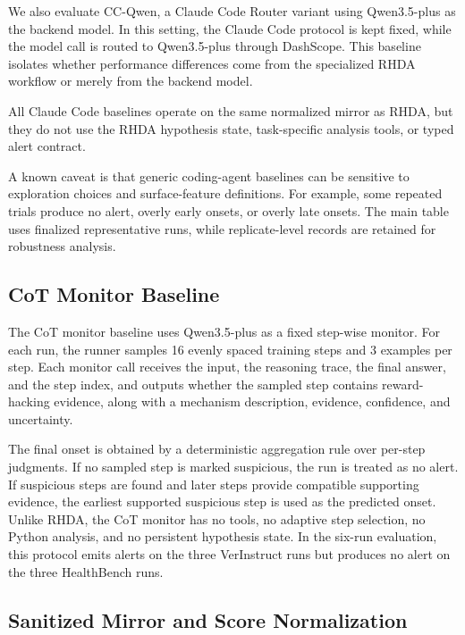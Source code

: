 \documentclass[11pt]{article}
\begin{document}
We also evaluate CC-Qwen, a Claude Code Router variant using Qwen3.5-plus as the backend model. In this setting, the Claude Code protocol is kept fixed, while the model call is routed to Qwen3.5-plus through DashScope. This baseline isolates whether performance differences come from the specialized RHDA workflow or merely from the backend model.

All Claude Code baselines operate on the same normalized mirror as RHDA, but they do not use the RHDA hypothesis state, task-specific analysis tools, or typed alert contract.

A known caveat is that generic coding-agent baselines can be sensitive to exploration choices and surface-feature definitions. For example, some repeated trials produce no alert, overly early onsets, or overly late onsets. The main table uses finalized representative runs, while replicate-level records are retained for robustness analysis.

\subsection{CoT Monitor Baseline}

The CoT monitor baseline uses Qwen3.5-plus as a fixed step-wise monitor. For each run, the runner samples 16 evenly spaced training steps and 3 examples per step. Each monitor call receives the input, the reasoning trace, the final answer, and the step index, and outputs whether the sampled step contains reward-hacking evidence, along with a mechanism description, evidence, confidence, and uncertainty.

The final onset is obtained by a deterministic aggregation rule over per-step judgments. If no sampled step is marked suspicious, the run is treated as no alert. If suspicious steps are found and later steps provide compatible supporting evidence, the earliest supported suspicious step is used as the predicted onset. Unlike RHDA, the CoT monitor has no tools, no adaptive step selection, no Python analysis, and no persistent hypothesis state.
In the six-run evaluation, this protocol emits alerts on the three VerInstruct runs but produces no alert on the three HealthBench runs.

\subsection{Sanitized Mirror and Score Normalization}
\label{app:sanitized_mirror}
\end{document}
